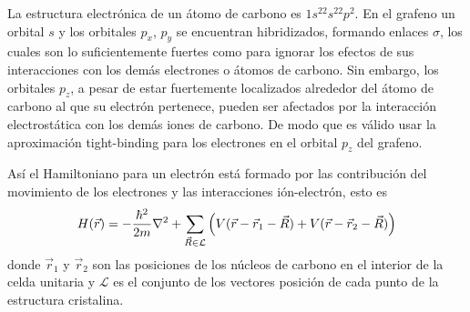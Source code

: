 La estructura electrónica de un átomo de carbono es $1s^22s^22p^2$. En el grafeno un orbital $s$ y los orbitales $p_x$, $p_y$ se encuentran hibridizados, formando enlaces $\sigma$, los cuales son lo suficientemente fuertes como para ignorar los efectos de sus interacciones con los demás electrones o átomos de carbono. Sin embargo, los orbitales $p_z$, a pesar de estar fuertemente localizados alrededor del átomo de carbono al que su electrón pertenece, pueden ser afectados por la interacción electrostática con los demás iones de carbono. De modo que es válido usar la aproximación tight-binding para los electrones en el orbital $p_z$ del grafeno.\par
Así el Hamiltoniano para un electrón está formado por las contribución del movimiento de los electrones y las interacciones ión-electrón, esto es
\begin{equation}
	H(\vec{r}) = - \frac{\hbar^2}{2m}\laplacian + \sum_{\vec{R}\in \mathcal{L}}\left( V(\vec{r} - \vec{r}_1 - \vec{R}) + V(\vec{r} - \vec{r}_2 - \vec{R})\right)
\end{equation}
donde $\vec{r}_1$ y $\vec{r}_2$ son las posiciones de los núcleos de carbono en el interior de la celda unitaria y $\mathcal{L}$ es el conjunto de los vectores posición de cada punto de la estructura cristalina.
